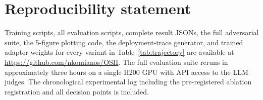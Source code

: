 \documentclass[10pt,letterpaper]{article}
\theoremstyle{definition}
\theoremstyle{plain}
\begin{document}
\section*{Reproducibility statement}

Training scripts, all evaluation scripts, complete result JSONs, the full
adversarial suite, the 5-figure plotting code, the deployment-trace
generator, and trained adapter weights for every variant in
Table~\ref{tab:trajectory} are available at \url{https://github.com/nkomianos/OSH}.
The full evaluation suite reruns in approximately three hours on a
single H200 GPU with API access to the LLM judges. The chronological
experimental log including the pre-registered ablation registration and
all decision points is included.


\end{document}
